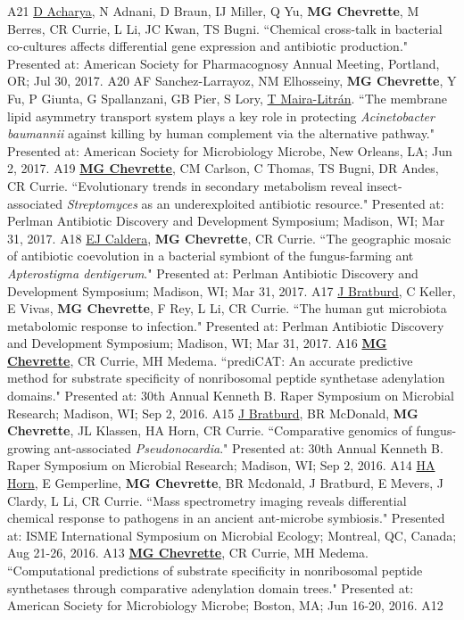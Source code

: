 \begin{cvpubs}
    {A21} %
  \cvpub
    {\underline{D Acharya}, N Adnani, D Braun, IJ Miller, Q Yu, \textbf{MG Chevrette}, M Berres, CR Currie, L Li, JC Kwan, TS Bugni. ``Chemical cross-talk in bacterial co-cultures affects differential gene expression and antibiotic production." Presented at: American Society for Pharmacognosy Annual Meeting, Portland, OR; Jul 30, 2017.} %
    {A20} %
  \cvpub
    {AF Sanchez-Larrayoz, NM Elhosseiny, \textbf{MG Chevrette}, Y Fu, P Giunta, G Spallanzani, GB Pier, S Lory, \underline{T Maira-Litr\'{a}n}. ``The membrane lipid asymmetry transport system plays a key role in protecting \textit{Acinetobacter baumannii} against killing by human complement via the alternative pathway." Presented at: American Society for Microbiology Microbe, New Orleans, LA; Jun 2, 2017.} %
    {A19} %
  \cvpub
    {\underline{\textbf{MG Chevrette}}, CM Carlson, C Thomas, TS Bugni, DR Andes, CR Currie. ``Evolutionary trends in secondary metabolism reveal insect-associated \textit{Streptomyces} as an underexploited antibiotic resource." Presented at: Perlman Antibiotic Discovery and Development Symposium; Madison, WI; Mar 31, 2017.} %
    {A18} %
  \cvpub
    {\underline{EJ Caldera}, \textbf{MG Chevrette}, CR Currie. ``The geographic mosaic of antibiotic coevolution in a bacterial symbiont of the fungus-farming ant \textit{Apterostigma dentigerum}." Presented at: Perlman Antibiotic Discovery and Development Symposium; Madison, WI; Mar 31, 2017.} %
    {A17} %
  \cvpub
    {\underline{J Bratburd}, C Keller, E Vivas, \textbf{MG Chevrette}, F Rey, L Li, CR Currie. ``The human gut microbiota metabolomic response to infection." Presented at: Perlman Antibiotic Discovery and Development Symposium; Madison, WI; Mar 31, 2017.} %
    {A16} %
  \cvpub
    {\textbf{\underline{MG Chevrette}}, CR Currie, MH Medema.  ``prediCAT: An accurate predictive method for substrate specificity of nonribosomal peptide synthetase adenylation domains." Presented at: 30th Annual Kenneth B. Raper Symposium on Microbial Research; Madison, WI; Sep 2, 2016.} %
    {A15} %
  \cvpub
    {\underline{J Bratburd}, BR McDonald, \textbf{MG Chevrette}, JL Klassen, HA Horn, CR Currie. ``Comparative genomics of fungus-growing ant-associated \textit{Pseudonocardia}." Presented at: 30th Annual Kenneth B. Raper Symposium on Microbial Research; Madison, WI; Sep 2, 2016.} %
    {A14} %
  \cvpub
    {\underline{HA Horn}, E Gemperline, \textbf{MG Chevrette}, BR Mcdonald, J Bratburd, E Mevers, J Clardy, L Li, CR Currie. ``Mass spectrometry imaging reveals differential chemical response to pathogens in an ancient ant-microbe symbiosis." Presented at: ISME International Symposium on Microbial Ecology; Montreal, QC, Canada; Aug 21-26, 2016.} %
    {A13} %
  \cvpub
    {\textbf{\underline{MG Chevrette}}, CR Currie, MH Medema.  ``Computational predictions of substrate specificity in nonribosomal peptide synthetases through comparative adenylation domain trees." Presented at: American Society for Microbiology Microbe; Boston, MA; Jun 16-20, 2016.} %
    {A12} %
\end{cvpubs}
